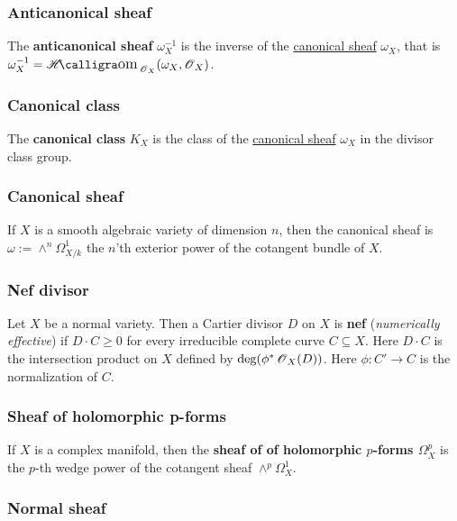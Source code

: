 \documentclass[11pt, english]{article}
\begin{document}
\subsubsection{Anticanonical sheaf}
\label{anticanonical}

The \textbf{anticanonical sheaf} $\omega_X^{-1}$ is the inverse of the \hyperref[canonicalsheaf]{canonical sheaf} $\omega_X$, that is $\omega_X^{-1} = \Shom_{\OO_X}(\omega_X,\OO_X)$.

\subsubsection{Canonical class}
\label{canonicaldivisor}

The \textbf{canonical class} $K_X$ is the class of the \hyperref[canonicalsheaf]{canonical sheaf} $\omega_X$ in the divisor class group.

\subsubsection{Canonical sheaf}
\label{canonicalsheaf} 

If $X$ is a smooth algebraic variety of dimension $n$, then the canonical sheaf is $\omega := \wedge^n \Omega^1_{X/k}$ the $n$'th exterior power of the cotangent bundle of $X$.

\subsubsection{Nef divisor}
\label{nef}

Let $X$ be a normal variety. Then a Cartier divisor $D$ on $X$ is \textbf{nef} (\emph{numerically effective}) if $D \cdot C \geq 0$ for every irreducible complete curve $C \subseteq X$. Here $D \cdot C$ is the intersection product on $X$ defined by $\deg(\phi^\ast \operatorname{\mathscr{O}}_X(D))$. Here $\phi:C' \to C$ is the normalization of $C$. 

\subsubsection{Sheaf of holomorphic p-forms}
\label{pforms}

If $X$ is a complex manifold, then the \textbf{sheaf of of holomorphic $p$-forms $\Omega_X^p$} is the $p$-th wedge power of the cotangent sheaf $\wedge^p \Omega_X^1$. 

\subsubsection{Normal sheaf}
\label{normalsheaf}
\end{document}
